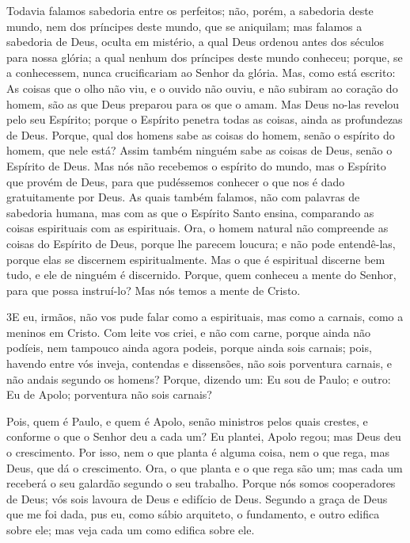 Todavia falamos sabedoria entre os perfeitos; não, porém, a
sabedoria deste mundo, nem dos príncipes deste mundo, que se
aniquilam; mas falamos a sabedoria de Deus, oculta em mistério,
a qual Deus ordenou antes dos séculos para nossa glória; a qual
nenhum dos príncipes deste mundo conheceu; porque, se a conhecessem,
nunca crucificariam ao Senhor da glória. Mas, como está escrito:
As coisas que o olho não viu, e o ouvido não ouviu, e não subiram ao
coração do homem, são as que Deus preparou para os que o amam.
Mas Deus no-las revelou pelo seu Espírito; porque o Espírito
penetra todas as coisas, ainda as profundezas de Deus.
Porque, qual dos homens sabe as coisas do homem, senão o
espírito do homem, que nele está? Assim também ninguém sabe as
coisas de Deus, senão o Espírito de Deus. Mas nós não
recebemos o espírito do mundo, mas o Espírito que provém de Deus,
para que pudéssemos conhecer o que nos é dado gratuitamente por
Deus. As quais também falamos, não com palavras de sabedoria
humana, mas com as que o Espírito Santo ensina, comparando as coisas
espirituais com as espirituais. Ora, o homem natural não
compreende as coisas do Espírito de Deus, porque lhe parecem
loucura; e não pode entendê-las, porque elas se discernem
espiritualmente. Mas o que é espiritual discerne bem tudo, e
ele de ninguém é discernido. Porque, quem conheceu a mente do
Senhor, para que possa instruí-lo? Mas nós temos a mente de Cristo.

\medskip

\lettrine{3} E eu, irmãos, não vos pude falar como a
espirituais, mas como a carnais, como a meninos em Cristo. Com
leite vos criei, e não com carne, porque ainda não podíeis, nem
tampouco ainda agora podeis, porque ainda sois carnais; pois,
havendo entre vós inveja, contendas e dissensões, não sois
porventura carnais, e não andais segundo os homens? Porque,
dizendo um: Eu sou de Paulo; e outro: Eu de Apolo; porventura não
sois carnais?

Pois, quem é Paulo, e quem é Apolo, senão ministros pelos quais
crestes, e conforme o que o Senhor deu a cada um? Eu plantei,
Apolo regou; mas Deus deu o crescimento. Por isso, nem o que
planta é alguma coisa, nem o que rega, mas Deus, que dá o
crescimento. Ora, o que planta e o que rega são um; mas cada um
receberá o seu galardão segundo o seu trabalho. Porque nós somos
cooperadores de Deus; vós sois lavoura de Deus e edifício de Deus.
Segundo a graça de Deus que me foi dada, pus eu, como sábio
arquiteto, o fundamento, e outro edifica sobre ele; mas veja cada um
como edifica sobre ele.

